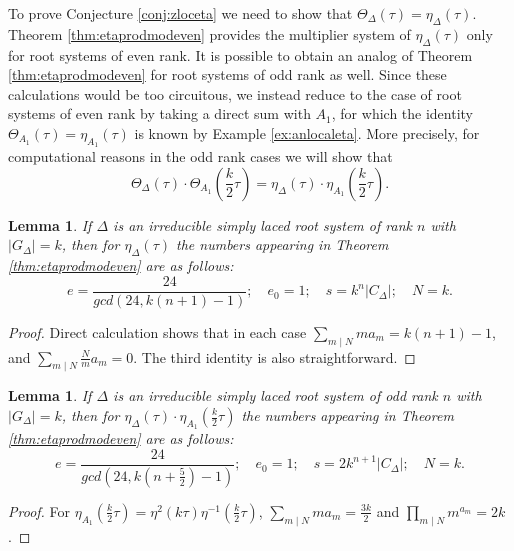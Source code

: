 \documentclass{article}
\newtheorem{lemma}[theorem]{Lemma}
\theoremstyle{definition}
\begin{document}
To prove Conjecture \ref{conj:zloceta} we need to show that $\Theta_{\Delta}(\tau)=\eta_{\Delta}(\tau)$. Theorem \ref{thm:etaprodmodeven} provides the multiplier system of $\eta_{\Delta}(\tau)$ only for root systems of even rank. It is possible to obtain an analog of Theorem \ref{thm:etaprodmodeven} for root systems of odd rank as well. Since these calculations would be too circuitous, we instead reduce to the case of root systems of even rank by taking a direct sum with $A_1$, for which the identity $\Theta_{A_1}(\tau)=\eta_{A_1}(\tau)$ is known by Example \ref{ex:anlocaleta}. More precisely, for computational reasons in the odd rank cases we will show that
\[\Theta_{\Delta}(\tau)\cdot \Theta_{A_1}\left(\frac{k}{2}\tau\right)=\eta_{\Delta}(\tau)\cdot \eta_{A_1}\left(\frac{k}{2}\tau\right).\]	
\begin{lemma}
	\label{lem:ee0s}
	If $\Delta$ is an irreducible simply laced root system of rank $n$ with $|G_{\Delta}|=k$, then for $\eta_{\Delta}(\tau)$ the numbers appearing in Theorem \ref{thm:etaprodmodeven}	 are as follows:
	\[ e=\frac{24}{gcd(24, k(n+1)-1)}; \quad e_0=1; \quad s=k^n|C_{\Delta}|; \quad N=k. \]
\end{lemma}
\begin{proof} Direct calculation shows that in each case $\sum_{m \mid N} ma_m=k(n+1)-1$, and $\sum_{m \mid N} \frac{N}{m}a_m=0$. The third identity is also straightforward.
\end{proof}
\begin{lemma}
	\label{lem:ee0sa1}
	If $\Delta$ is an irreducible simply laced root system of odd rank $n$ with $|G_{\Delta}|=k$, then for $\eta_{\Delta}(\tau) \cdot \eta_{A_1}(\frac{k}{2}\tau)$ the numbers appearing in Theorem \ref{thm:etaprodmodeven} are as follows:
	\[ e=\frac{24}{gcd(24, k(n+\frac{5}{2})-1)}; \quad e_0=1; \quad s=2k^{n+1}|C_{\Delta}|; \quad N=k. \]
\end{lemma}
\begin{proof} For $\eta_{A_1}(\frac{k}{2}\tau)=\eta^2(k\tau)\eta^{-1}(\frac{k}{2}\tau)$, $\sum_{m \mid N} ma_m=\frac{3k}{2}$ and $\prod_{m \mid N} m^{a_m}=2k$. \end{proof}
\end{document}

